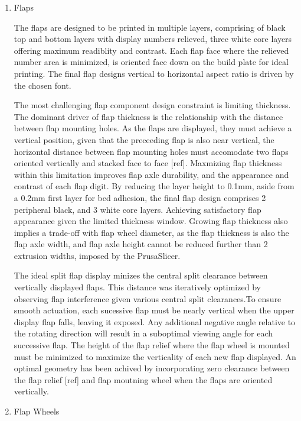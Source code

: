 \documentclass[11pt]{article}
\begin{document}
\begin{enumerate}
\item Flaps
\label{sec:orgd389e61}

The flaps are designed to be printed in multiple layers, comprising of black top and bottom layers with display numbers relieved,  three white core layers offering maximum readiblity and contrast. Each flap face where the relieved number area is minimized, is oriented face down on the build plate for ideal printing. The final flap designs vertical to horizontal aspect ratio is driven by the chosen font.

The most challenging flap component design constraint is limiting thickness. The dominant driver of flap thickness is the relationship with the distance between flap mounting holes. As the flaps are displayed, they must achieve a vertical position, given that the preceeding flap is also near vertical, the horizontal distance between flap mounting holes must accomodate two flaps oriented vertically and stacked face to face [ref]. Maxmizing flap thickness within this limitation improves flap axle durability, and the appearance and contrast of each flap digit. By reducing the layer height to 0.1mm, aside from a 0.2mm first layer for bed adhesion, the final flap design comprises 2 peripheral black, and 3 white core layers. Achieving satisfactory flap appearance given the limited thickness window. Growing flap thickness also implies a trade-off with flap wheel diameter, as the flap thickness is also the flap axle width, and flap axle height cannot be reduced further than 2 extrusion widths, imposed by the PrusaSlicer.

The ideal split flap display minizes the central split clearance between vertically displayed flaps. This distance was iteratively optimized by observing flap interference given various central split clearances.To ensure smooth actuation, each sucessive flap must be nearly vertical when the upper display flap falls, leaving it exposed. Any additional negative angle relative to the rotating direction will result in a suboptimal viewing angle for each successive flap. The height of the flap relief where the flap wheel is mounted must be minimized to maximize the verticality of each new flap displayed. An optimal geometry has been achived by incorporating zero clearance between the flap relief [ref] and flap moutning wheel when the flaps are oriented vertically.

\item Flap Wheels
\label{sec:org38a7c3d}


\end{enumerate}
\end{document}
